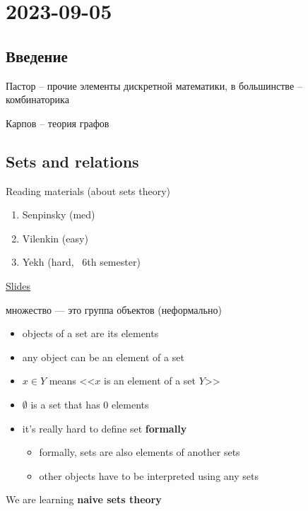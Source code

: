 
\section{2023-09-05}

\subsection{Введение}

Пастор -- прочие элементы дискретной математики, в большинстве -- комбинаторика

Карпов -- теория графов

\subsection{Sets and relations}
Reading materials (about sets theory)
\begin{enumerate}
	\item Senpinsky (med)
	\item Vilenkin (easy)
	\item Yekh (hard, ~6th semester)
\end{enumerate}

\href{https://logic.pdmi.ras.ru/~pastor/ITMO/2023-24/}{Slides}


\begin{definition}[Sets]
	множество — это группа объектов (неформально)\end{definition}

\begin{itemize}
	\item objects of a set are its elements
	\item any object can be an element of a set 
	\item $x \in Y$ means <<$x$ is an element of a set $Y$>>
	\item $\emptyset$ is a set that has 0 elements 
\end{itemize}
\begin{itemize}
	\item it's really hard to define set {\bf{formally}}
		\begin{itemize}
		\item formally, sets are also elements of another sets 
		\item other objects have to be interpreted using any sets
	\end{itemize}
\end{itemize}

We are learning {\bf{naive sets theory}}

